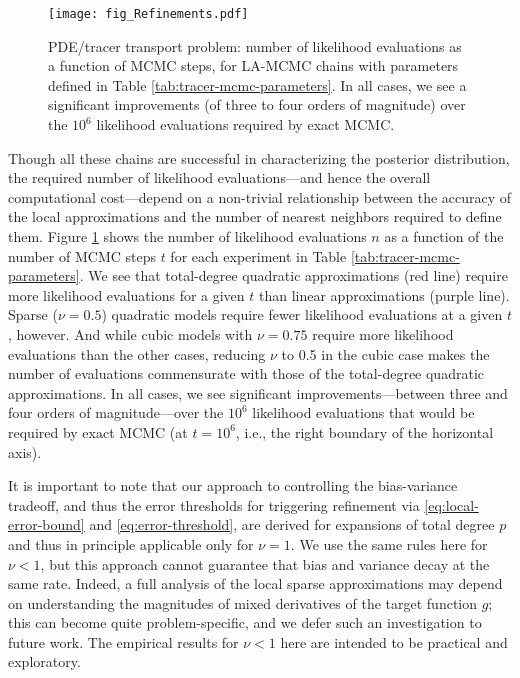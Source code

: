 \begin{figure}
\centering
  \texttt{[image: fig\_Refinements.pdf]} 
  \caption{PDE/tracer transport problem: number of likelihood evaluations as a function of MCMC steps, for LA-MCMC chains with parameters defined in Table \ref{tab:tracer-mcmc-parameters}. In all cases, we see a significant improvements (of three to four orders of magnitude) over the $10^6$ likelihood evaluations required by exact MCMC.}
  \label{fig:tracer-refinements}
\end{figure}

Though all these chains are successful in characterizing the posterior distribution, the required number of likelihood evaluations---and hence the overall computational cost---depend on a non-trivial relationship between the accuracy of the local approximations and the number of nearest neighbors required to define them. Figure \ref{fig:tracer-refinements} shows the number of likelihood evaluations $n$ as a function of the number of MCMC steps $t$ for each experiment in Table \ref{tab:tracer-mcmc-parameters}. We see that total-degree quadratic approximations (red line) require more likelihood evaluations for a given $t$ than linear approximations (purple line). Sparse ($\nu = 0.5$) quadratic models require fewer likelihood evaluations at a given $t$, however. And while cubic models with $\nu = 0.75$ require more likelihood evaluations than the other cases, reducing $\nu$ to 0.5 in the cubic case makes the number of  evaluations commensurate with those of the total-degree quadratic approximations. In all cases, we see significant improvements---between three and four orders of magnitude---over the $10^6$ likelihood evaluations that would be required by exact MCMC (at $t =10^6$, i.e., the right boundary of the horizontal axis).

It is important to note that our approach to controlling the bias-variance tradeoff, and thus the error thresholds for triggering refinement via \eqref{eq:local-error-bound} and \eqref{eq:error-threshold}, are derived for expansions of total degree $p$ and thus in principle applicable only for $\nu=1$. We use the same rules here for $\nu<1$, but this approach cannot guarantee that bias and variance decay at the same rate. Indeed, a full analysis of the local sparse approximations may depend on understanding the magnitudes of mixed derivatives of the target function $g$; this can become quite problem-specific, and we defer such an investigation to future work. The empirical results for $\nu<1$ here are intended to be practical and exploratory.

